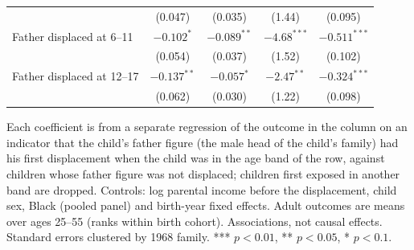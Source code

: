 \begin{table}[htbp]
{\begin{tabular}{lcccc}
 & (0.047) & (0.035) & (1.44) & (0.095) \\
Father displaced at 6--11 & $-0.102^{*}$ & $-0.089^{**}$ & $-4.68^{***}$ & $-0.511^{***}$ \\
 & (0.054) & (0.037) & (1.52) & (0.102) \\
Father displaced at 12--17 & $-0.137^{**}$ & $-0.057^{*}$ & $-2.47^{**}$ & $-0.324^{***}$ \\
 & (0.062) & (0.030) & (1.22) & (0.098) \\
\bottomrule
\end{tabular}}
\begin{minipage}{0.95\textwidth}\footnotesize Each coefficient is from a separate regression of the outcome in the column on an indicator that the child's father figure (the male head of the child's family) had his first displacement when the child was in the age band of the row, against children whose father figure was not displaced; children first exposed in another band are dropped. Controls: log parental income before the displacement, child sex, Black (pooled panel) and birth-year fixed effects. Adult outcomes are means over ages 25--55 (ranks within birth cohort). Associations, not causal effects. Standard errors clustered by 1968 family. *** $p<0.01$, ** $p<0.05$, * $p<0.1$.\end{minipage}
\end{table}
